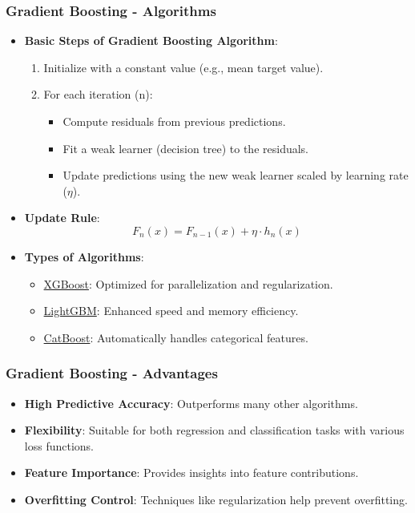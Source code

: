\documentclass[aspectratio=169]{beamer}
\begin{document}
\begin{frame}[fragile]
    \frametitle{Gradient Boosting - Algorithms}
    \begin{itemize}
        \item \textbf{Basic Steps of Gradient Boosting Algorithm}:
        \begin{enumerate}
            \item Initialize with a constant value (e.g., mean target value).
            \item For each iteration (n):
            \begin{itemize}
                \item Compute residuals from previous predictions.
                \item Fit a weak learner (decision tree) to the residuals.
                \item Update predictions using the new weak learner scaled by learning rate ($\eta$).
            \end{itemize}
        \end{enumerate}
        
        \item \textbf{Update Rule}:
        \begin{equation}
        F_{n}(x) = F_{n-1}(x) + \eta \cdot h_n(x)
        \end{equation}
        
        \item \textbf{Types of Algorithms}:
        \begin{itemize}
            \item \underline{XGBoost}: Optimized for parallelization and regularization.
            \item \underline{LightGBM}: Enhanced speed and memory efficiency.
            \item \underline{CatBoost}: Automatically handles categorical features.
        \end{itemize}
    \end{itemize}
\end{frame}

\begin{frame}[fragile]
    \frametitle{Gradient Boosting - Advantages}
    \begin{itemize}
        \item \textbf{High Predictive Accuracy}: Outperforms many other algorithms.
        \item \textbf{Flexibility}: Suitable for both regression and classification tasks with various loss functions.
        \item \textbf{Feature Importance}: Provides insights into feature contributions.
        \item \textbf{Overfitting Control}: Techniques like regularization help prevent overfitting.
    \end{itemize}
\end{frame}
\end{document}
